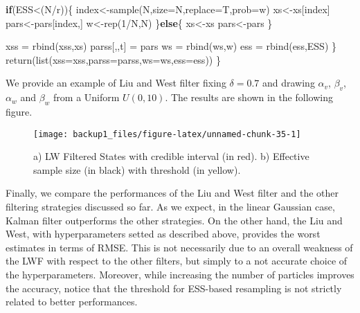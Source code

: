 \documentclass[
]{book}
\newenvironment{Shaded}{\begin{snugshade}}{\end{snugshade}}
\newcommand{\AttributeTok}[1]{\textcolor[rgb]{0.77,0.63,0.00}{#1}}
\newcommand{\ControlFlowTok}[1]{\textcolor[rgb]{0.13,0.29,0.53}{\textbf{#1}}}
\newcommand{\DecValTok}[1]{\textcolor[rgb]{0.00,0.00,0.81}{#1}}
\newcommand{\FunctionTok}[1]{\textcolor[rgb]{0.00,0.00,0.00}{#1}}
\newcommand{\NormalTok}[1]{#1}
\newcommand{\OtherTok}[1]{\textcolor[rgb]{0.56,0.35,0.01}{#1}}
\newcommand{\SpecialCharTok}[1]{\textcolor[rgb]{0.00,0.00,0.00}{#1}}
\theoremstyle{break}
\theoremstyle{nonumberplain}
\begin{document}
\begin{Shaded}
\begin{Highlighting}[]
    \ControlFlowTok{if}\NormalTok{(ESS}\SpecialCharTok{\textless{}}\NormalTok{(N}\SpecialCharTok{/}\NormalTok{r))\{}
\NormalTok{      index}\OtherTok{\textless{}{-}}\FunctionTok{sample}\NormalTok{(N,}\AttributeTok{size=}\NormalTok{N,}\AttributeTok{replace=}\NormalTok{T,}\AttributeTok{prob=}\NormalTok{w)}
\NormalTok{      xs}\OtherTok{\textless{}{-}}\NormalTok{xs[index]}
\NormalTok{      pars}\OtherTok{\textless{}{-}}\NormalTok{pars[index,]}
\NormalTok{      w}\OtherTok{\textless{}{-}}\FunctionTok{rep}\NormalTok{(}\DecValTok{1}\SpecialCharTok{/}\NormalTok{N,N)}
\NormalTok{    \}}\ControlFlowTok{else}\NormalTok{\{}
\NormalTok{      xs}\OtherTok{\textless{}{-}}\NormalTok{xs}
\NormalTok{      pars}\OtherTok{\textless{}{-}}\NormalTok{pars}
\NormalTok{    \}}
    
    
\NormalTok{    xss         }\OtherTok{=} \FunctionTok{rbind}\NormalTok{(xss,xs)}
\NormalTok{    parss[,,t]  }\OtherTok{=}\NormalTok{ pars }
\NormalTok{    ws          }\OtherTok{=} \FunctionTok{rbind}\NormalTok{(ws,w)}
\NormalTok{    ess         }\OtherTok{=} \FunctionTok{rbind}\NormalTok{(ess,ESS)}
\NormalTok{  \}}
  \FunctionTok{return}\NormalTok{(}\FunctionTok{list}\NormalTok{(}\AttributeTok{xss=}\NormalTok{xss,}\AttributeTok{parss=}\NormalTok{parss,}\AttributeTok{ws=}\NormalTok{ws,}\AttributeTok{ess=}\NormalTok{ess))}
\NormalTok{\}}
\end{Highlighting}
\end{Shaded}

We provide an example of Liu and West filter fixing \(\delta=0.7\) and
drawing \(\alpha_{v}\), \(\beta_{v}\), \(\alpha_{w}\) and \(\beta_{w}\)
from a Uniform \(U(0,10)\). The results are shown in the following
figure.

\begin{figure}[H]

{\centering \texttt{[image: backup1\_files/figure-latex/unnamed-chunk-35-1]} 

}

\caption{a) LW Filtered States with credible interval (in red). b) Effective sample size (in black) with threshold (in yellow).}\label{fig:unnamed-chunk-35}
\end{figure}

Finally, we compare the performances of the Liu and West filter and the
other filtering strategies discussed so far. As we expect, in the linear
Gaussian case, Kalman filter outperforms the other strategies. On the
other hand, the Liu and West, with hyperparameters setted as described
above, provides the worst estimates in terms of RMSE. This is not
necessarily due to an overall weakness of the LWF with respect to the
other filters, but simply to a not accurate choice of the
hyperparameters. Moreover, while increasing the number of particles
improves the accuracy, notice that the threshold for ESS-based
resampling is not strictly related to better performances.
\end{document}
